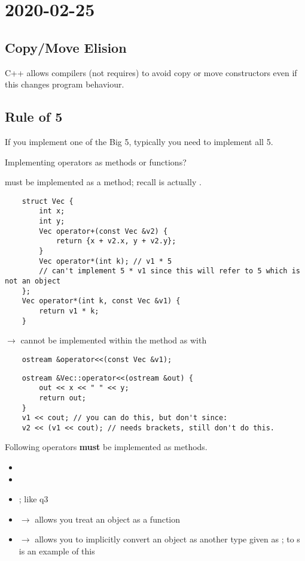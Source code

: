 \section{2020-02-25}
\subsection{Copy/Move Elision}
C++ allows compilers (not requires) to avoid copy or move constructors
even if this changes program behaviour.

\subsection{Rule of 5}
If you implement one of the Big 5, typically you need to implement
all 5.

Implementing operators as methods or functions?

 must be implemented as a method; recall 
is actually .

\begin{lstlisting}
    struct Vec {
        int x;
        int y;
        Vec operator+(const Vec &v2) {
            return {x + v2.x, y + v2.y};
        }
        Vec operator*(int k); // v1 * 5
        // can't implement 5 * v1 since this will refer to 5 which is not an object
    };
    Vec operator*(int k, const Vec &v1) {
        return v1 * k;
    }
\end{lstlisting}
 $ \rightarrow $ cannot be implemented within the method as with
\begin{lstlisting}
    ostream &operator<<(const Vec &v1);
\end{lstlisting}
\begin{lstlisting}
    ostream &Vec::operator<<(ostream &out) {
        out << x << " " << y;
        return out;
    }
    v1 << cout; // you can do this, but don't since:
    v2 << (v1 << cout); // needs brackets, still don't do this.
\end{lstlisting}

Following operators \textbf{must} be implemented as methods.
\begin{itemize}
      \item {}
      \item {}
      \item {}; like q3
      \item {} $ \rightarrow $ allows you treat an object as a function
      \item {} $ \rightarrow $ allows you to implicitly convert
            an object as another type given as ;  to s
            is an example of this
\end{itemize}

